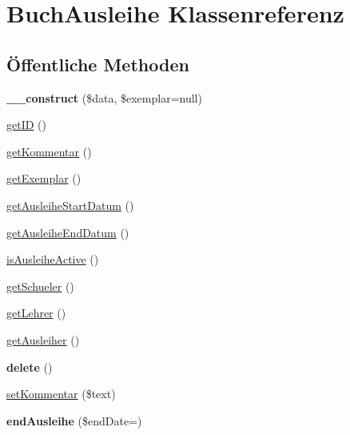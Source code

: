\hypertarget{class_buch_ausleihe}{}\section{Buch\+Ausleihe Klassenreferenz}
\label{class_buch_ausleihe}
\subsection*{Öffentliche Methoden}
\begin{DoxyCompactItemize}
\item 
\mbox{\label{class_buch_ausleihe_abaab5c75be2d8969e0383df5e19d64b1}} 
{\bfseries \+\_\+\+\_\+construct} (\$data, \$exemplar=null)
\item 
\mbox{\hyperlink{class_buch_ausleihe_a9032093212a7ee4aea97d4b489703064}{get\+ID}} ()
\item 
\mbox{\hyperlink{class_buch_ausleihe_aea7a7f54505b97982c3eaa2c3f69ffcc}{get\+Kommentar}} ()
\item 
\mbox{\hyperlink{class_buch_ausleihe_a3be8dd6025b3daf101ffd7cfbe7de314}{get\+Exemplar}} ()
\item 
\mbox{\hyperlink{class_buch_ausleihe_a6999838b1319b2023e8ce1ffd7e735b4}{get\+Ausleihe\+Start\+Datum}} ()
\item 
\mbox{\hyperlink{class_buch_ausleihe_aef028e0218f9fa040a010dd84a4d3416}{get\+Ausleihe\+End\+Datum}} ()
\item 
\mbox{\hyperlink{class_buch_ausleihe_aba966ede70571dfe5adfd4935c55e114}{is\+Ausleihe\+Active}} ()
\item 
\mbox{\hyperlink{class_buch_ausleihe_a75db3987f92dd5e0e6dda0a5e4827dd8}{get\+Schueler}} ()
\item 
\mbox{\hyperlink{class_buch_ausleihe_af5e15787efbbfc52566757a7dbefea54}{get\+Lehrer}} ()
\item 
\mbox{\hyperlink{class_buch_ausleihe_a618cf53c891c96f350f2545b6b16b6f0}{get\+Ausleiher}} ()
\item 
\mbox{\label{class_buch_ausleihe_aa702c620da03bd00596e08cfa60749f6}} 
{\bfseries delete} ()
\item 
\mbox{\hyperlink{class_buch_ausleihe_aecfe97c0b68ca0f445b08086cfb50033}{set\+Kommentar}} (\$text)
\item 
\mbox{\label{class_buch_ausleihe_a529bdfd0849ba5ed33a8c3a602eb7cba}} 
{\bfseries end\+Ausleihe} (\$end\+Date=\textquotesingle{}\textquotesingle{})
\end{DoxyCompactItemize}
